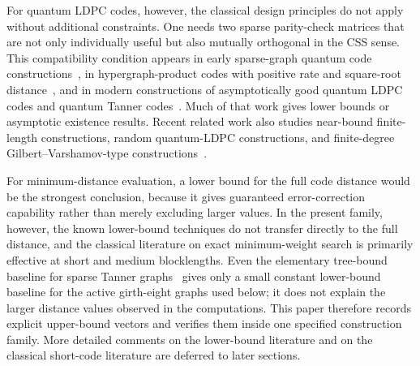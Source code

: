 \documentclass[11pt]{article}
\newcommand{\markededit}[1]{#1}
\theoremstyle{uprightthm}
\begin{document}
For quantum LDPC codes, however, the classical design principles do not apply
without additional constraints. One needs two sparse parity-check matrices that
are not only individually useful but also mutually orthogonal in the CSS sense.
This compatibility condition appears in early sparse-graph quantum code
constructions~\cite{MacKay2004,HagiwaraImai2007}, in hypergraph-product codes
with positive rate and square-root distance~\cite{TillichZemor2014}, and in
modern constructions of asymptotically good quantum LDPC codes and quantum
Tanner codes~\cite{PanteleevKalachev2022,LeverrierZemor2022,DinurHsiehLinVidick2023}. Much of that work
gives lower bounds or asymptotic existence results.
Recent related work also studies near-bound finite-length constructions,
random quantum-LDPC constructions, and finite-degree
Gilbert--Varshamov-type constructions~\cite{KomotoKasai2025,OkadaKasai2025,KasaiGV2026}.

For minimum-distance evaluation, a lower bound for the full code distance would
be the strongest conclusion, because it \markededit{gives}
guaranteed error-correction capability rather than merely excluding larger
values. In the present family, however, the known lower-bound techniques do not
transfer directly to the full distance, and the classical literature on exact
minimum-weight search is primarily effective at short and medium blocklengths.
Even the elementary tree-bound baseline for sparse Tanner graphs~\cite{Tanner1981}
gives only a small constant lower-bound baseline for the active girth-eight graphs used below; it
does not \markededit{explain} the larger distance values observed in the computations.
This paper therefore records explicit upper-bound vectors and verifies them
inside one specified construction family. More detailed comments on the lower-bound literature and on the
classical short-code literature are deferred to later sections.
\end{document}

